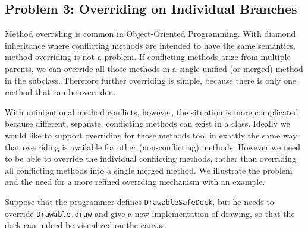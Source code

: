 \subsection{Problem 3: Overriding on Individual Branches}\label{subsec:partialoverrides}

Method overriding is common in Object-Oriented Programming. 
With diamond inheritance where conflicting methods are intended to have 
the same semantics, method overriding is not a problem. If conflicting
methods arize from multiple parents, we can override all those methods 
in a single unified (or merged) method in the subclass. Therefore
further overriding is simple, because there is only one method that
can be overriden. 

With unintentional method conflicts, however, the situation is more
complicated because different, separate, conflicting methods can exist
in a class. Ideally we would like to support overriding for those
methods too, in exactly the same way that overriding is available for 
other (non-conflicting) methods. However we need to be able to
override the individual conflicting methods, rather than overriding all
conflicting methods into a single merged method.  We illustrate the
problem and the need for a more refined overrding mechanism with 
an example.

Suppose that the programmer defines \lstinline|DrawableSafeDeck|, but he needs to override
\lstinline|Drawable.draw| and give a new implementation of drawing, so that the deck can indeed be visualized on the canvas.


